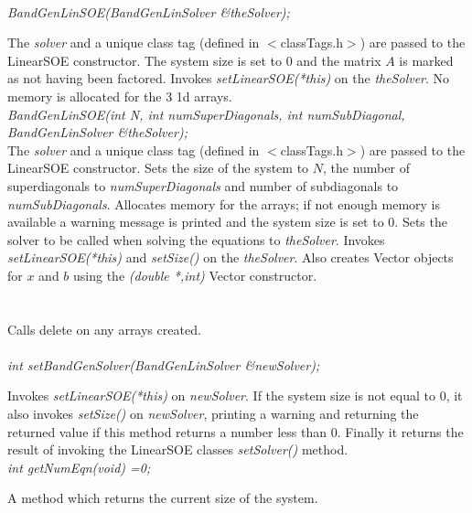   \\
{\em BandGenLinSOE(BandGenLinSolver \&theSolver);}  

The {\em solver} and a unique class tag (defined in $<$classTags.h$>$)
are passed to the LinearSOE constructor. The system size is set
to $0$ and the matrix $A$ is marked as not having been factored. Invokes
{\em setLinearSOE(*this)} on the {\em theSolver}. No memory is
allocated for the 3 1d arrays. \\  


{\em BandGenLinSOE(int N, int numSuperDiagonals, int numSubDiagonal,
		  BandGenLinSolver \&theSolver);        }\\
The {\em solver} and a unique class tag (defined in $<$classTags.h$>$)
are passed to the LinearSOE constructor. 
Sets the size of the system to $N$, the number of superdiagonals to 
{\em numSuperDiagonals} and number of subdiagonals to {\em
numSubDiagonals}. Allocates memory for the arrays; if not enough
memory is available a warning message is printed and the system size
is set to $0$. Sets the solver to be called when solving the
equations to {\em theSolver}. Invokes {\em setLinearSOE(*this)} and
{\em setSize()} on the {\em theSolver}. Also creates Vector objects
for $x$ and $b$ using the {\em (double *,int)} Vector constructor. \\


 \\
\\ 
Calls delete on any arrays created. \\

  \\
{\em  int setBandGenSolver(BandGenLinSolver \&newSolver);}

Invokes {\em setLinearSOE(*this)} on {\em newSolver}.
If the system size is not equal to $0$, it also invokes {\em setSize()}
on {\em newSolver}, printing a warning and returning the returned value if this
method returns a number less than $0$. Finally it returns the result
of invoking the LinearSOE classes {\em setSolver()} method. \\

{\em int getNumEqn(void) =0; } 

A method which returns the current size of the system. \\

